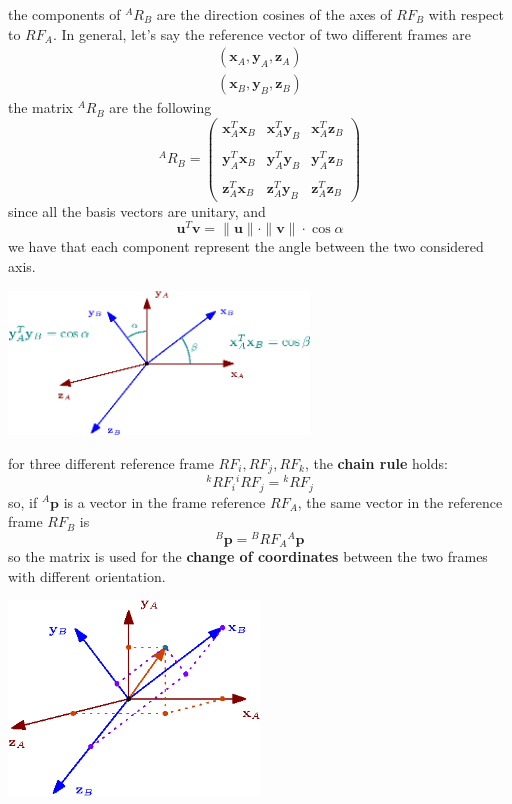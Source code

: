 \documentclass[10pt, letterpaper]{report}
\begin{document}
the components of ${}^AR_B$ are the direction cosines of the axes of $RF_B$ with respect to $RF_A$. In general, let's say the reference vector of two different frames are\begin{align}
    (\mathbf x_A,\mathbf y_A,\mathbf z_A)\\
    (\mathbf x_B,\mathbf y_B,\mathbf z_B)
\end{align}
the matrix ${}^AR_B$ are the following\begin{equation}
    {}^AR_B=\begin{pmatrix}
        \mathbf x^T_A\mathbf x_B&\mathbf x^T_A\mathbf y_B&\mathbf x^T_A\mathbf z_B\\ \\
        \mathbf y^T_A\mathbf x_B&\mathbf y^T_A\mathbf y_B&\mathbf y^T_A\mathbf z_B\\ \\
        \mathbf z^T_A\mathbf x_B&\mathbf z^T_A\mathbf y_B&\mathbf z^T_A\mathbf z_B
    \end{pmatrix}
\end{equation}
since all the basis vectors are unitary, and\begin{equation}
    \mathbf u^T\mathbf v=\|\mathbf u\|\cdot\|\mathbf v\|\cdot\cos\alpha
\end{equation}
we have that each component represent the angle between the two considered axis.
\begin{center}
    \includegraphics[width=0.6\textwidth ]{images/orientation_reference.eps}
\end{center}
for three different reference frame $RF_i,RF_j,RF_k$, the \textbf{chain rule} holds:\begin{equation}
    {}^kRF_i{}^iRF_j={}^kRF_j
\end{equation}
so, if ${}^A\mathbf p$ is a vector in the frame reference $RF_A$, the same vector in the reference frame $RF_B$ is\begin{equation}
    {}^B\mathbf p={}^BRF_A{}^A\mathbf p
\end{equation}
so the matrix is used for the \textbf{change of coordinates} between the two frames with different orientation.\begin{center}
    \includegraphics[width=0.5\textwidth ]{images/coordinate_change.eps}
\end{center}
\end{document}
